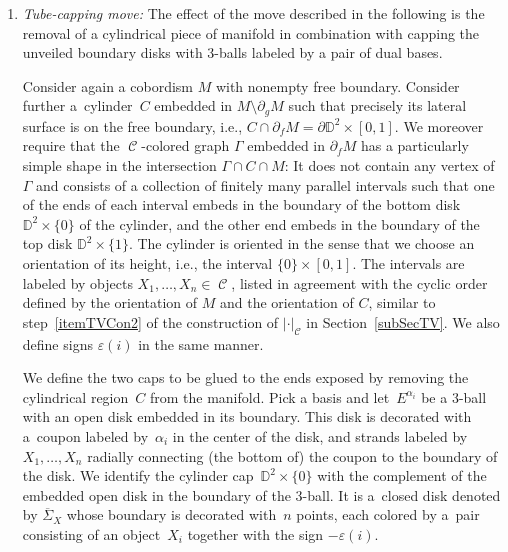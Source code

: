 \documentclass[pdftex]{sigma}
\DeclareMathOperator{\Hom}{Hom}
\DeclareMathOperator{\calc}{\mathcal{C}}
\numberwithin{equation}{section}
\theoremstyle{definition}
\begin{document}
\begin{enumerate}
 \begin{align*}
 \adjincludegraphics[valign=c, scale = 0.72]{images/tunnelPre.pdf} \, \xrightarrow{\Delta_2^X(\iota)} \, \adjincludegraphics[valign=c, scale = 0.72]{images/tunnelPost.pdf}.
 \end{align*}
 The reason why we explicitly keep the embedding notationally is that for different embeddings $\iota, \iota'\colon C \hookrightarrow M$, the cobordisms $\Delta_2^X(\iota)(M)$ and $\Delta_2^X(\iota')(M)$ need not be equivalent.
 \item \textit{Tube-capping move:} The effect of the move described in the following is the removal of a cylindrical piece of manifold in combination with capping the unveiled boundary disks with 3-balls labeled by a pair of dual bases.

 Consider again a cobordism $M$ with nonempty free boundary. Consider further a~cylinder~$C$ embedded in $M\setminus\partial_gM$ such that precisely its lateral surface is on the free boundary, i.e., $C \cap \partial_f M = \partial \mathbb{D}^2 \times [0,1]$. We moreover require that the $\calc$-colored graph $\Gamma$ embedded in $\partial_f M$ has a particularly simple shape in the intersection $\Gamma \cap C \cap M$: It does not contain any vertex of $\Gamma$ and consists of a collection of finitely many parallel intervals such that one of the ends of each interval embeds in the boundary of the bottom disk $\mathbb{D}^2 \times \{0\}$ of the cylinder, and the other end embeds in the boundary of the top disk $\mathbb{D}^2 \times \{1\}$. The cylinder is oriented in the sense that we choose an orientation of its height, i.e., the interval $\{0\} \times [0,1]$. The intervals are labeled by objects $X_1, \dots, X_n \in \calc$, listed in agreement with the cyclic order defined by the orientation of $M$ and the orientation of $C$, similar to step~\ref{itemTVCon2} of the construction of $|\cdot|_{\calc}$ in Section~\ref{subSecTV}. We also define signs $\varepsilon(i)$ in the same manner.

 We define the two caps to be glued to the ends exposed by removing the cylindrical region~$C$ from the manifold. Pick a basis \smash{$\{\alpha_i\} \subset \Hom_{\mathcal{C}}\bigl(X_1^{\varepsilon(1)} \otimes \dots \otimes X_n^{\varepsilon(n)}, \mathbbm{1}\bigr)$} and let~$E^{\alpha_i}$ be a 3-ball with an open disk embedded in its boundary. This disk is decorated with a~coupon labeled by~$\alpha_i$ in the center of the disk, and strands labeled by~$X_1, \dots, X_n$ radially connecting (the bottom of) the coupon to the boundary of the disk. We identify the cylinder cap~$\mathbb{D}^2 \times \{0\}$ with the complement of the embedded open disk in the boundary of the 3-ball. It is a~closed disk denoted by $\overline\Sigma_X$ whose boundary is decorated with~$n$ points, each colored by a~pair consisting of an object~$X_i$ together with the sign $-\varepsilon(i)$.


\end{enumerate}
\end{document}
